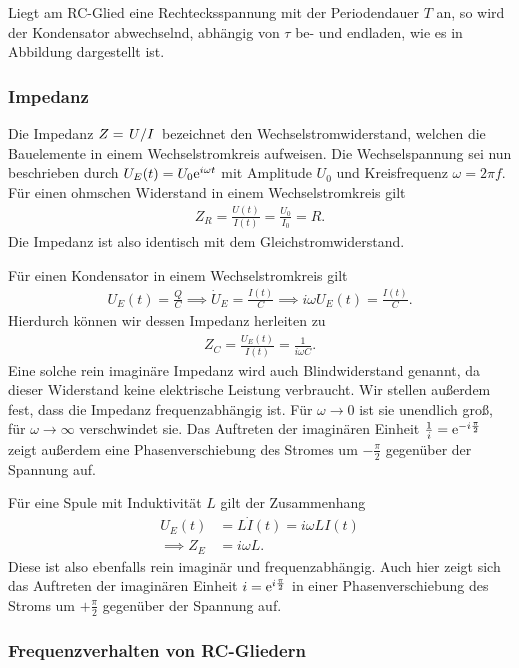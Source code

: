 Liegt am RC-Glied eine Rechtecksspannung mit der Periodendauer $T$ an, so wird der Kondensator abwechselnd, abhängig von $\tau$ be- und endladen, wie es in Abbildung  dargestellt ist.

\subsubsection*{Impedanz}
Die Impedanz $Z = \ffrac{U}{I}$ bezeichnet den Wechselstromwiderstand, welchen die Bauelemente in einem Wechselstromkreis aufweisen. Die Wechselspannung sei nun beschrieben durch $U_E(t) = U_0\text{e}^{i \omega t}$ mit Amplitude $U_0$ und Kreisfrequenz $\omega = 2\pi f$. Für einen ohmschen Widerstand in einem Wechselstromkreis gilt
\begin{align}
  Z_R = \frac{U(t)}{I(t)} = \frac{U_0}{I_0} = R.
\end{align}
Die Impedanz ist also identisch mit dem Gleichstromwiderstand. 

Für einen Kondensator in einem Wechselstromkreis gilt
\begin{align}
  U_E(t) = \frac{Q}{C} \implies \dot{U}_E = \frac{I(t)}{C} \implies i \omega U_E(t) = \frac{I(t)}{C}.
\end{align}
Hierdurch können wir dessen Impedanz herleiten zu
\begin{align}
  Z_C = \frac{U_E(t)}{I(t)} = \frac{1}{i \omega C}.
\end{align}
Eine solche rein imaginäre Impedanz wird auch Blindwiderstand genannt, da dieser Widerstand keine elektrische Leistung verbraucht. Wir stellen außerdem fest, dass die Impedanz frequenzabhängig ist. Für $\omega \to 0$ ist sie unendlich groß, für $\omega \to \infty$ verschwindet sie. Das Auftreten der imaginären Einheit $\frac{1}{i} = \text{e}^{-i \frac{\pi}{2}}$ zeigt außerdem eine Phasenverschiebung des Stromes um $-\frac{\pi}{2}$ gegenüber der Spannung auf.

Für eine Spule mit Induktivität $L$ gilt der Zusammenhang
\begin{align}
  U_E(t) &= L \dot{I}(t) = i\omega LI(t)\\[1em]
  \implies Z_E &= i \omega L.
\end{align}
Diese ist also ebenfalls rein imaginär und frequenzabhängig. Auch hier zeigt sich das Auftreten der imaginären Einheit $i = \text{e}^{i\frac{\pi}{2}}$ in einer Phasenverschiebung des Stroms um $+\frac{\pi}{2}$ gegenüber der Spannung auf.

\subsubsection*{Frequenzverhalten von RC-Gliedern}

